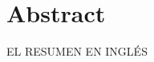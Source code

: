 \documentclass[../main.tex]{subfiles}
\begin{document}
\chapter*{Abstract}\label{ch:en_abstract}
\thispagestyle{empty}
EL RESUMEN EN INGLÉS
\end{document}
